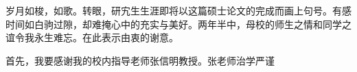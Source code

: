 
\begin{acknowledgements}

    岁月如梭，如歌。转眼，研宄生生涯即将以这篇硕士论文的完成而画上句号。有感时间如白驹过隙，却难掩心中的充实与美好。两年半中，母校的师生之情和同学之谊令我永生难忘。在此表示由衷的谢意。
    
    首先，我要感谢我的校内指导老师张信明教授。张老师治学严谨
    
\end{acknowledgements}
